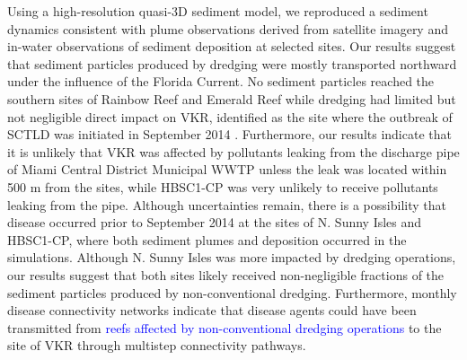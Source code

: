 \documentclass[preprint,12pt,authoryear]{elsarticle}
\newcommand{\modif}[1]{\textcolor{blue}{#1}}
\begin{document}
Using a high-resolution quasi-3D sediment model, we reproduced a sediment dynamics consistent with plume observations derived from satellite imagery and in-water observations of sediment deposition at selected sites. Our results suggest that sediment particles produced by dredging were mostly transported northward under the influence of the Florida Current. No sediment particles reached the southern sites of Rainbow Reef and Emerald Reef while dredging had limited but not negligible direct impact on VKR, identified as the site where the outbreak of SCTLD was initiated in September 2014 \citep{precht2016unprecedented}. Furthermore, our results indicate that it is unlikely that VKR was affected by pollutants leaking from the discharge pipe of Miami Central District Municipal WWTP unless the leak was located within 500 m from the sites, while HBSC1-CP was very unlikely to receive pollutants leaking from the pipe. Although uncertainties remain, there is a possibility that disease occurred prior to September 2014 at the sites of N. Sunny Isles and HBSC1-CP, where both sediment plumes and deposition occurred in the simulations. Although N. Sunny Isles was more impacted by dredging operations, our results suggest that both sites likely received non-negligible fractions of the sediment particles produced by non-conventional dredging. Furthermore, monthly disease connectivity networks indicate that disease agents could have been transmitted from \modif{reefs affected by non-conventional dredging operations} to the site of VKR through multistep connectivity pathways.
\end{document}
